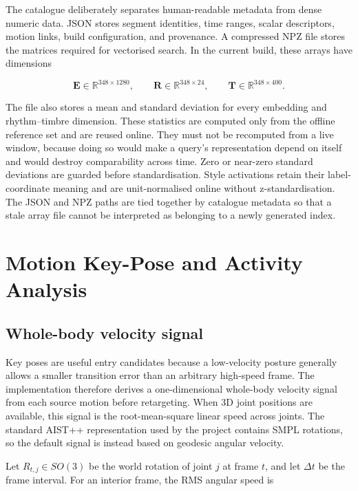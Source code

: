 The catalogue deliberately separates human-readable metadata from dense
numeric data. JSON stores segment identities, time ranges, scalar descriptors,
motion links, build configuration, and provenance. A compressed NPZ file stores
the matrices required for vectorised search. In the current build, these arrays
have dimensions

\begin{equation}
    \mathbf{E}\in\mathbb{R}^{348\times1280},\qquad
    \mathbf{R}\in\mathbb{R}^{348\times24},\qquad
    \mathbf{T}\in\mathbb{R}^{348\times400}.
    \label{eq:catalogue_array_shapes}
\end{equation}

The file also stores a mean and standard deviation for every embedding and
rhythm--timbre dimension. These statistics are computed only from the offline
reference set and are reused online. They must not be recomputed from a live
window, because doing so would make a query's representation depend on itself
and would destroy comparability across time. Zero or near-zero standard
deviations are guarded before standardisation. Style activations retain their
label-coordinate meaning and are unit-normalised online without
z-standardisation. The JSON and NPZ paths are tied together by catalogue
metadata so that a stale array file cannot be interpreted as belonging to a
newly generated index.

\section{Motion Key-Pose and Activity Analysis}
\label{sec:motion_analysis}

\subsection{Whole-body velocity signal}
\label{subsec:motion_velocity}

Key poses are useful entry candidates because a low-velocity posture generally
allows a smaller transition error than an arbitrary high-speed frame. The
implementation therefore derives a one-dimensional whole-body velocity signal
from each source motion before retargeting. When 3D joint positions are
available, this signal is the root-mean-square linear speed across joints. The
standard AIST++ representation used by the project contains SMPL rotations, so
the default signal is instead based on geodesic angular velocity.

Let $R_{t,j}\in SO(3)$ be the world rotation of joint $j$ at frame $t$, and let
$\Delta t$ be the frame interval. For an interior frame, the RMS angular speed
is

